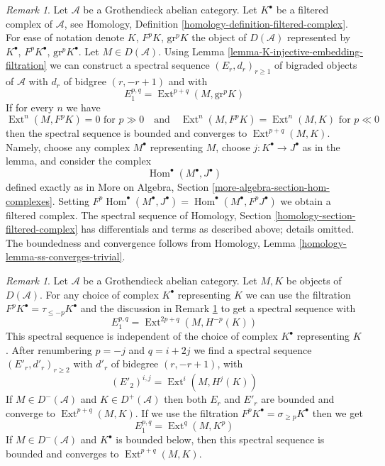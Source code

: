 \documentclass{stacks-project}
\theoremstyle{plain}
\theoremstyle{definition}
\theoremstyle{remark}
\newtheorem{remark}[subsection]{Remark}
\numberwithin{equation}{subsection}
\def\Hom{\mathop{\mathrm{Hom}}\nolimits}
\def\Ext{\mathop{\mathrm{Ext}}\nolimits}
\begin{document}
\begin{remark}
\label{remark-ext-into-filtered-complex}
Let $\mathcal{A}$ be a Grothendieck abelian category.
Let $K^\bullet$ be a filtered complex of $\mathcal{A}$, see
Homology, Definition \ref{homology-definition-filtered-complex}.
For ease of notation denote $K$, $F^pK$, $\text{gr}^pK$ the
object of $D(\mathcal{A})$ represented by $K^\bullet$,
$F^pK^\bullet$, $\text{gr}^pK^\bullet$. Let $M \in D(\mathcal{A})$.
Using Lemma \ref{lemma-K-injective-embedding-filtration}
we can construct a spectral sequence $(E_r, d_r)_{r \geq 1}$
of bigraded objects of $\mathcal{A}$ with $d_r$ of bidgree
$(r, -r + 1)$ and
with
$$
E_1^{p, q} = \Ext^{p + q}(M, \text{gr}^pK)
$$
If for every $n$ we have
$$
\Ext^n(M, F^pK) = 0 \text{ for } p \gg 0
\quad\text{and}\quad
\Ext^n(M, F^pK) = \Ext^n(M, K) \text{ for } p \ll 0
$$
then the spectral sequence is bounded and converges to $\Ext^{p + q}(M, K)$.
Namely, choose any complex $M^\bullet$ representing $M$, choose
$j : K^\bullet \to J^\bullet$ as in the lemma, and consider the complex
$$
\Hom^\bullet(M^\bullet, J^\bullet)
$$
defined exactly as in
More on Algebra, Section \ref{more-algebra-section-hom-complexes}.
Setting $F^p\Hom^\bullet(M^\bullet, J^\bullet) =
\Hom^\bullet(M^\bullet, F^pJ^\bullet)$ we obtain a filtered complex.
The spectral sequence of
Homology, Section \ref{homology-section-filtered-complex}
has differentials and terms as described above; details omitted.
The boundedness and convergence follows from
Homology, Lemma \ref{homology-lemma-ss-converges-trivial}.
\end{remark}

\begin{remark}
\label{remark-spectral-sequences-ext}
Let $\mathcal{A}$ be a Grothendieck abelian category.
Let $M, K$ be objects of $D(\mathcal{A})$.
For any choice of complex $K^\bullet$ representing $K$ we
can use the filtration $F^pK^\bullet = \tau_{\leq -p}K^\bullet$
and the discussion in Remark \ref{remark-ext-into-filtered-complex}
to get a spectral sequence with
$$
E_1^{p, q} = \Ext^{2p + q}(M, H^{-p}(K))
$$
This spectral sequence is independent of the choice of
complex $K^\bullet$ representing $K$. After renumbering
$p = -j$ and $q = i + 2j$ we find a spectral sequence
$(E'_r, d'_r)_{r \geq 2}$ with $d'_r$ of bidegree $(r, -r + 1)$, with
$$
(E'_2)^{i, j} = \Ext^i(M, H^j(K))
$$
If $M \in D^-(\mathcal{A})$ and $K \in D^+(\mathcal{A})$ then
both $E_r$ and $E'_r$ are bounded and converge to $\Ext^{p + q}(M, K)$.
If we use the filtration $F^pK^\bullet = \sigma_{\geq p}K^\bullet$
then we get
$$
E_1^{p, q} = \Ext^q(M, K^p)
$$
If $M \in D^-(\mathcal{A})$ and $K^\bullet$ is bounded below, then
this spectral sequence is bounded and converges to $\Ext^{p + q}(M, K)$.
\end{remark}
\end{document}
